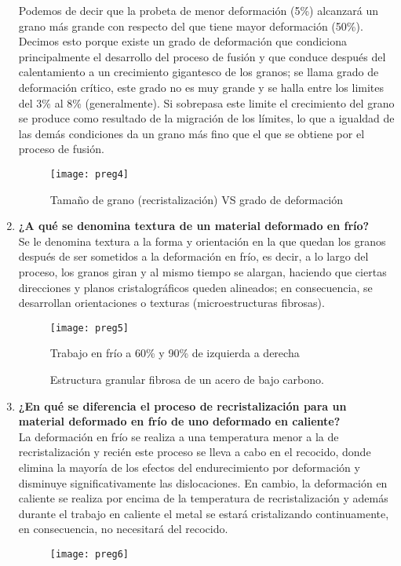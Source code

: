 \documentclass[a4paper,12pt]{report}
\begin{document}
\begin{enumerate}
Podemos de decir que la probeta de menor deformación (5\%) alcanzará un grano más grande con respecto del que tiene mayor deformación (50\%).\\
Decimos esto porque existe un grado de deformación que condiciona principalmente el desarrollo del proceso de fusión y que conduce después del calentamiento a un crecimiento gigantesco de los granos; se llama grado de deformación crítico, este grado no es muy grande y se halla entre los limites del 3\% al 8\% (generalmente). Si sobrepasa este limite el crecimiento del grano se produce como resultado de la migración de los límites, lo que a igualdad de las demás condiciones da un grano más fino que el que se obtiene por el proceso de fusión.
\begin{figure}[H]
\centering
\texttt{[image: preg4]}
\caption{Tamaño de grano (recristalización) VS grado de deformación}
\end{figure}
\item \textbf{¿A qué se denomina textura de un material deformado en frío?}\\
Se le denomina textura a la forma y orientación en la que quedan los granos después de ser sometidos a la deformación en frío, es decir, a lo largo del proceso, los granos giran y al mismo tiempo se alargan, haciendo que ciertas direcciones y planos cristalográficos queden alineados; en consecuencia, se desarrollan orientaciones o texturas (microestructuras fibrosas). 
\begin{figure}[H]
\centering
\texttt{[image: preg5]}
\caption[Estructura granular fibrosa de un acero de bajo carbono]{Estructura granular fibrosa de un acero de bajo carbono.}{Trabajo en frío a 60\% y 90\% de izquierda a derecha}
\end{figure}
\item \textbf{¿En qué se diferencia el proceso de recristalización para un material deformado en frío de uno deformado en caliente?}\\
La deformación en frío se realiza a una temperatura menor a la de recristalización y recién este proceso se lleva a cabo en el recocido, donde elimina la mayoría de los efectos del endurecimiento por deformación y disminuye significativamente las dislocaciones. En cambio, la deformación en caliente se realiza por encima de la temperatura de recristalización y además durante el trabajo en caliente el metal se estará cristalizando continuamente, en consecuencia, no necesitará del recocido.
\begin{figure}[H]
\centering
\texttt{[image: preg6]}
\end{figure}
\end{enumerate}
\end{document}
